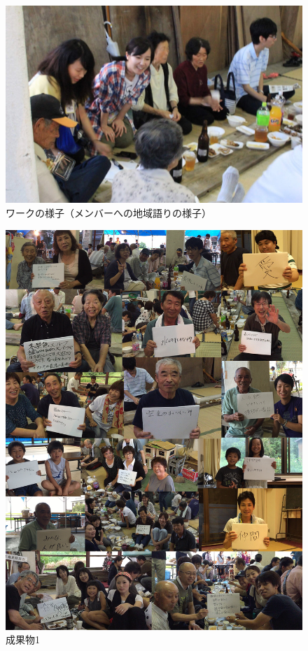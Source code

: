 \documentclass[a4paper]{jsarticle}
\begin{document}
\begin{itemize}
\begin{figure}[H]
  \begin{center}
    \includegraphics[width=0.8\hsize]{./images/IMG_4784.JPG}
    \caption{ワークの様子（メンバーへの地域語りの様子）}
    \label{fig:tmu_hino}
  \end{center}
\end{figure}
\begin{figure}[H]
  \begin{center}
    \includegraphics[width=1.0\hsize]{./images/yokone.jpg}
    \caption{成果物1}
    \label{fig:tmu_hino}
  \end{center}
\end{figure}



\end{itemize}
\end{document}
